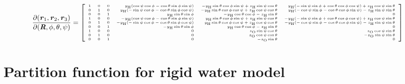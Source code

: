 \documentclass[aip,jcp,a4paper,reprint,onecolumn]{revtex4-1}
\newcommand{\vect}[1]{\textbf{\textit{#1}}}
\newcommand{\footh}{\textrm{\tiny H}}
\newcommand{\footo}{\textrm{\tiny O}}
\begin{document}
\begin{align}
  \frac
  {\partial (\vect r_1, \vect r_2, \vect r_3)}
  {\partial (\vect R, \phi, \theta, \psi)}
  =
  \left[
  \tiny
  \begin{array}{rrrrrr}
    1 & 0 & 0 &
    y_\footh(\cos\psi \cos\phi - \cos\theta \sin\phi \sin\psi) &
    - y_\footh \sin\theta \cos\phi \sin\psi +
    z_\footh \sin\psi \cos\theta &
    y_\footh(-\sin\psi \sin\phi + \cos\theta \cos\phi \cos\psi) +
    z_\footh \cos\psi \sin\theta\\
    0 & 1 & 0 &
    y_\footh (-\sin\psi \cos\phi - \cos\theta \sin\phi \cos\psi) &
    - y_\footh \sin\theta \cos\phi \cos\psi +
    z_\footh \cos\psi \cos\theta &
    y_\footh (-\cos\psi \sin\phi - \cos\theta \cos\phi \sin\psi) -
    z_\footh \sin\psi \sin\theta \\    
    0 & 0 & 1 &
    y_\footh \sin\theta \sin\phi &
    - y_\footh \cos\theta \cos\phi - z_\footh \sin\theta &
    0 \\
    1 & 0 & 0 &
    -y_\footh(\cos\psi \cos\phi - \cos\theta \sin\phi \sin\psi) &
    y_\footh \sin\theta \cos\phi \sin\psi +
    z_\footh \sin\psi \cos\theta &
    -y_\footh(-\sin\psi \sin\phi + \cos\theta \cos\phi \cos\psi) +
    z_\footh \cos\psi \sin\theta\\
    0 & 1 & 0 &
    -y_\footh (-\sin\psi \cos\phi - \cos\theta \sin\phi \cos\psi) &
    y_\footh \sin\theta \cos\phi \cos\psi +
    z_\footh \cos\psi \cos\theta &
    -y_\footh (-\cos\psi \sin\phi - \cos\theta \cos\phi \sin\psi) -
    z_\footh \sin\psi \sin\theta \\    
    0 & 0 & 1 &
    -y_\footh \sin\theta \sin\phi &
    y_\footh \cos\theta \cos\phi - z_\footh \sin\theta &
    0 \\    
    1 & 0 & 0 &
    0 &
    z_\footo \sin\psi \cos\theta &
    z_\footo \cos\psi \sin\theta \\
    0 & 1 & 0 &
    0 &
    z_\footo \cos\psi \cos\theta &
    -z_\footo \sin\psi \sin\theta \\
    0 & 0 & 1 &
    0 &
    -z_\footo \sin\theta &
    0
  \end{array}
  \right]
\end{align}

\section{Partition function for rigid water model}
\end{document}
